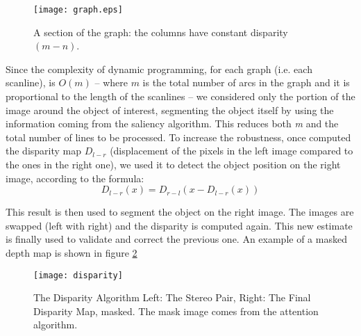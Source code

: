 \begin{figure}
	\centering
		\texttt{[image: graph.eps]}
	\caption{A section of the graph: the columns have constant disparity $(m-n)$.}
	\label{fig-graph}
\end{figure}

Since the complexity of dynamic programming, for each graph (i.e. each scanline), is $O(m)$ -- where $m$ is the total number of arcs in the graph and it is proportional to the length of the scanlines -- we considered only the portion of the image around the object of interest, segmenting the object itself by using the information coming from the saliency algorithm. This reduces both {\em m} and the total number of lines to be processed. To increase the robustness, once computed the disparity map $D_{l-r}$ (displacement of the pixels in the left image compared to the ones in the right one), we used it to detect the object position on the right image, according to the formula: 
\begin{equation}D_{l-r}(x)=D_{r-l}(x-D_{l-r}(x))\end{equation}

This result is then used to segment the object on the right image. The images are swapped (left with right) and the disparity is computed again. This new estimate is finally used to validate and correct the previous one. An example of a masked depth map is shown in figure \ref{fig-disparity}

\begin{figure}
\centering
\texttt{[image: disparity]}
\caption{The Disparity Algorithm  Left: The Stereo Pair, Right: The Final Disparity Map, masked. The mask image comes from the attention algorithm.}
\label{fig-disparity}
\end{figure}

